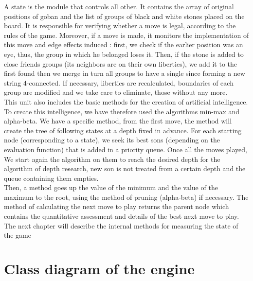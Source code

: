\documentclass[a4paper,10pt,twoside]{report}
\begin{document}
	A state is the module that controls all other. It contains the array of original positions of goban and the list of groups of black and white stones placed on the board. It is responsible for verifying whether a move is legal, according to the rules of the game. Moreover, if a move is made, it monitors the implementation of this move and edge effects induced : first, we check if the earlier position was an eye, thus, the group in which he belonged loses it. Then, if the stone is added to close friends groups (its neighbors are on their own liberties), we add it to the first found then we merge in turn all groups to have a single since forming a new string 4-connected. If necessary, liberties are recalculated, boundaries of each group are modified and we take care to eliminate, those without any more.\\

	This unit also includes the basic methods for the creation of artificial intelligence. To create this intelligence, we have therefore used the algorithms min-max and alpha-beta. We have a specific method, from the first move, the method will create the tree of following states at a depth fixed in advance. For each starting node (corresponding to a state), we seek its best sons (depending on the evaluation function) that is added in a priority queue. Once all the moves played, We start again the algorithm on them to reach the desired depth for the algorithm of depth research, new son is not treated from a certain depth and the queue containing them empties.\\

	Then, a method goes up the value of the minimum and the value of the maximum to the root, using the method of pruning (alpha-beta) if necessary. The method of calculating the next move to play returns the parent node which contains the quantitative assessment and details of the best next move to play.\\

	The next chapter will describe the internal methods for measuring the state of the game

	\section{Class diagram of the engine} 
\end{document}
